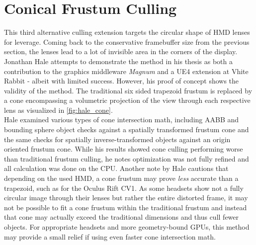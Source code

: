 \section{Conical Frustum Culling}
This third alternative culling extension targets the circular shape of HMD lenses for leverage. Coming back to the conservative framebuffer size from the previous section, the lenses lead to a lot of invisible area in the corners of the display. Jonathan Hale attempts to demonstrate the method in his thesis \cite{Hale.2018} as both a contribution to the graphics middleware \textit{Magnum}\cite{Vondrus.30.10.2019} and a UE4 extension at Vhite Rabbit\cite{VhiteRabbit.08.01.2020} - albeit with limited success. However, his proof of concept shows the validity of the method. The traditional six sided trapezoid frustum is replaced by a cone encompassing a volumetric projection of the view through each respective lens as visualized in \autoref{fig:hale_cone}. \\
Hale examined various types of cone intersection math, including AABB and bounding sphere object checks against a spatially transformed frustum cone and the same checks for spatially inverse-transformed objects against an origin oriented frustum cone. While his results showed cone culling performing worse than traditional frustum culling, he notes optimization was not fully refined and all calculation was done on the CPU. 
Another note by Hale cautions that depending on the used HMD, a cone frustum may prove \textit{less} accurate than a trapezoid, such as for the Oculus Rift CV1. As some headsets show not a fully circular image through their lenses but rather the entire distorted frame, it may not be possible to fit a cone frustum within the traditional frustum and instead that cone may actually exceed the traditional dimensions and thus cull fewer objects. 
For appropriate headsets and more geometry-bound GPUs, this method may provide a small relief if using even faster cone intersection math. 


